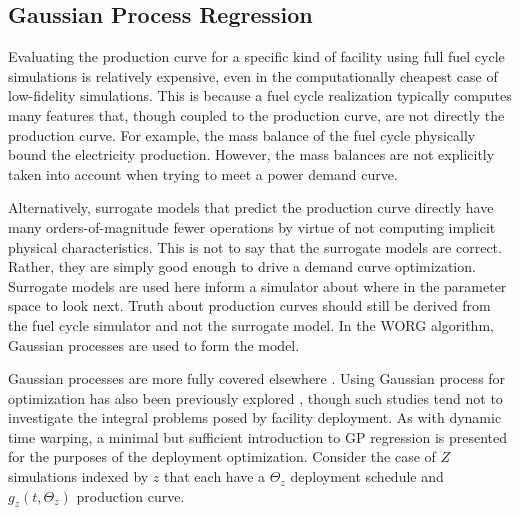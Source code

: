 \subsection{Gaussian Process Regression}
\label{gp}

Evaluating the production curve for a specific kind of facility using 
full fuel cycle simulations is relatively expensive, even in the 
computationally cheapest case of low-fidelity simulations. This is because a 
fuel cycle realization 
typically computes many features that, though coupled to the production 
curve, are not directly the production curve. For example, the mass balance of 
the fuel cycle physically bound the electricity production. However, the    
mass balances are not explicitly taken into account when trying to meet
a power demand curve.

Alternatively, surrogate models that predict the production curve directly
have many orders-of-magnitude fewer operations by virtue of not computing
implicit physical characteristics. This is not to say that the surrogate 
models are correct.  Rather, they are simply good enough to drive a demand
curve 
optimization. Surrogate models are used here inform a simulator about where
in the parameter space to look next. Truth about production curves should
still be derived from the fuel cycle simulator and not the surrogate model.
In the WORG algorithm, Gaussian processes are used to form the model. 

Gaussian processes are more fully covered elsewhere 
\cite{rasmussen2006gaussian}. Using Gaussian process for optimization has 
also been previously explored \cite{osborne2009gaussian}, though such studies 
tend not to 
investigate the integral problems posed by facility deployment. As with 
dynamic time warping, a minimal but sufficient introduction to GP regression
is presented 
for the purposes of the deployment optimization.
Consider the case of $Z$ simulations indexed by $z$ that each have a 
$\Theta_z$ deployment schedule and $g_z(t, \Theta_z)$ production curve.

